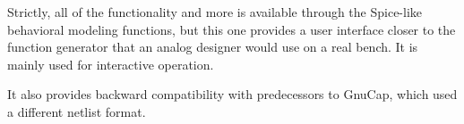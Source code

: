Strictly, all of the functionality and more is available through the
Spice-like behavioral modeling functions, but this one provides a user 
interface closer to the function generator that an analog designer
would use on a real bench.  It is mainly used for interactive operation.

It also provides backward compatibility with predecessors to GnuCap,
which used a different netlist format.
